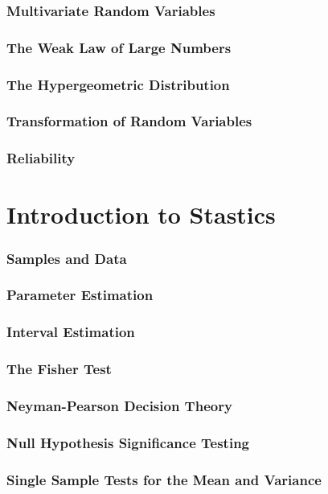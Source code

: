 \documentclass[11pt,a4paper]{article}
\begin{document}
\section{Multivariate Random Variables}
\section{The Weak Law of Large Numbers}
\section{The Hypergeometric Distribution}
\section{Transformation of Random Variables}
\section{Reliability}

\newpage
\part{Introduction to Stastics}
\section{Samples and Data}
\section{Parameter Estimation}
\section{Interval Estimation}
\section{The Fisher Test}
\section{Neyman-Pearson Decision Theory}
\section{Null Hypothesis Significance Testing}
\section{Single Sample Tests for the Mean and Variance}
\end{document}
